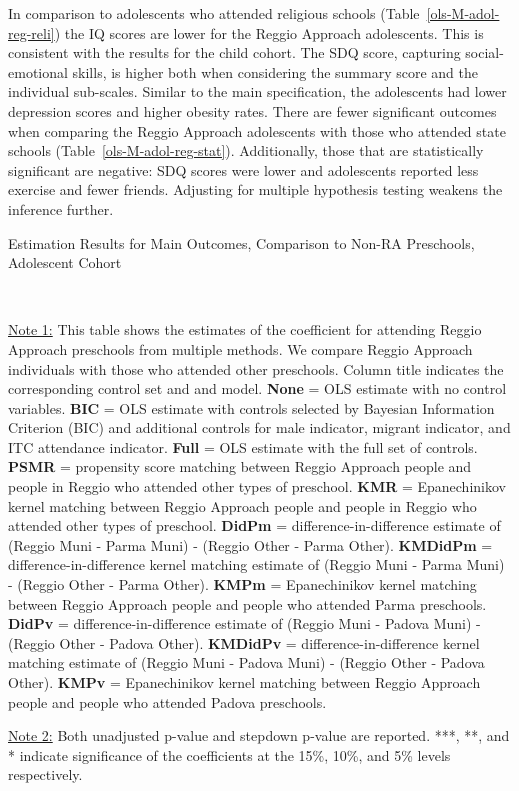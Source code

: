 In comparison to adolescents who attended religious schools (Table~\ref{ols-M-adol-reg-reli}) the IQ scores are lower for the Reggio Approach adolescents. This is consistent with the results for the child cohort. The SDQ score, capturing social-emotional skills, is higher both when considering the summary score and the individual sub-scales. Similar to the main specification, the adolescents had lower depression scores and higher obesity rates. There are fewer significant outcomes when comparing the Reggio Approach adolescents with those who attended state schools (Table~\ref{ols-M-adol-reg-stat}). Additionally, those that are statistically significant are negative: SDQ scores were lower and adolescents reported less exercise and fewer friends. Adjusting for multiple hypothesis testing weakens the inference further.



\begin{table}[H] \caption{Estimation Results for Main Outcomes, Comparison to Non-RA Preschools, Adolescent Cohort} \label{ols-M-adol-reg-pres}
\scalebox{0.6}{}
\vspace{1ex} \\
\footnotesize\raggedright{\underline{Note 1:} This table shows the estimates of the coefficient for attending Reggio Approach preschools from multiple methods. We compare Reggio Approach individuals with those who attended other preschools. Column title indicates the corresponding control set and and model. \textbf{None} = OLS estimate with no control variables. \textbf{BIC} = OLS estimate with controls selected by Bayesian Information Criterion (BIC) and additional controls for male indicator, migrant indicator, and ITC attendance indicator. \textbf{Full} = OLS estimate with the full set of controls. \textbf{PSMR} =  propensity score matching between Reggio Approach people and people in Reggio who attended other types of preschool. \textbf{KMR} = Epanechinikov kernel matching between Reggio Approach people and people in Reggio who attended other types of preschool. \textbf{DidPm} = difference-in-difference estimate of (Reggio Muni - Parma Muni) - (Reggio Other - Parma Other). \textbf{KMDidPm} = difference-in-difference kernel matching estimate of (Reggio Muni - Parma Muni) - (Reggio Other - Parma Other).   \textbf{KMPm} = Epanechinikov kernel matching between Reggio Approach people and people who attended Parma preschools. \textbf{DidPv} = difference-in-difference estimate of (Reggio Muni - Padova Muni) - (Reggio Other - Padova Other). \textbf{KMDidPv} = difference-in-difference kernel matching estimate of (Reggio Muni - Padova Muni) - (Reggio Other - Padova Other).  \textbf{KMPv} = Epanechinikov kernel matching between Reggio Approach people and people who attended Padova preschools.}

\footnotesize\raggedright{\underline{Note 2:} Both unadjusted p-value and stepdown p-value are reported. ***, **, and * indicate significance of the coefficients at the 15\%, 10\%, and 5\% levels respectively.}
\end{table}




